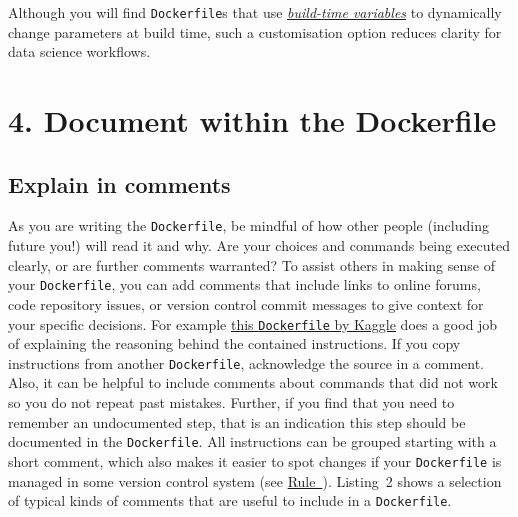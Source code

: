 \documentclass[10pt,letterpaper]{article}
\begin{document}
Although you will find \texttt{Dockerfile}s that use
\href{https://docs.docker.com/engine/reference/commandline/build/\#set-build-time-variables---build-arg}{\emph{build-time
variables}} to dynamically change parameters at build time, such a
customisation option reduces clarity for data science workflows.

\hypertarget{document-within-the-dockerfile}{%
\section{4. Document within the
Dockerfile}\label{document-within-the-dockerfile}}

  \label{rule:document} 

\hypertarget{explain-in-comments}{%
\subsection{Explain in comments}\label{explain-in-comments}}

As you are writing the \texttt{Dockerfile}, be mindful of how other
people (including future you!) will read it and why. Are your choices
and commands being executed clearly, or are further comments warranted?
To assist others in making sense of your \texttt{Dockerfile}, you can
add comments that include links to online forums, code repository
issues, or version control commit messages to give context for your
specific decisions. For example
\href{https://github.com/Kaggle/docker-rstats/blob/master/Dockerfile}{this
\texttt{Dockerfile} by Kaggle} does a good job of explaining the
reasoning behind the contained instructions. If you copy instructions
from another \texttt{Dockerfile}, acknowledge the source in a comment.
Also, it can be helpful to include comments about commands that did not
work so you do not repeat past mistakes. Further, if you find that you
need to remember an undocumented step, that is an indication this step
should be documented in the \texttt{Dockerfile}. All instructions can be
grouped starting with a short comment, which also makes it easier to
spot changes if your \texttt{Dockerfile} is managed in some version
control system (see
\hyperref[{rule:publish}]{Rule~}). Listing~2
shows a selection of typical kinds of comments that are useful to
include in a \texttt{Dockerfile}.

\scriptsize
\end{document}
